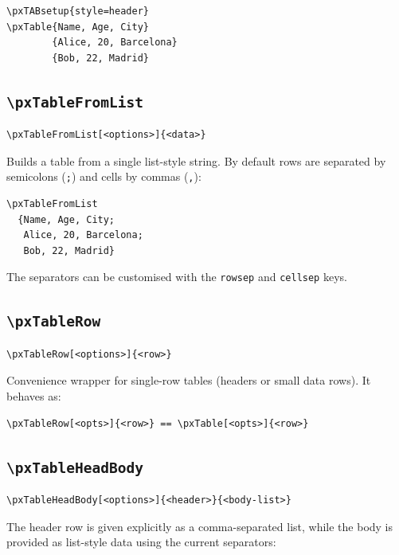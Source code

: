 \documentclass[11pt,a4paper]{article}
\begin{document}
\begin{verbatim}
\pxTABsetup{style=header}
\pxTable{Name, Age, City}
        {Alice, 20, Barcelona}
        {Bob, 22, Madrid}
\end{verbatim}

\subsection{\texttt{\textbackslash pxTableFromList}}

\begin{verbatim}
\pxTableFromList[<options>]{<data>}
\end{verbatim}

Builds a table from a single list-style string.  By default rows are
separated by semicolons (\verb|;|) and cells by commas (\verb|,|):

\begin{verbatim}
\pxTableFromList
  {Name, Age, City;
   Alice, 20, Barcelona;
   Bob, 22, Madrid}
\end{verbatim}

The separators can be customised with the \texttt{rowsep} and
\texttt{cellsep} keys.

\subsection{\texttt{\textbackslash pxTableRow}}

\begin{verbatim}
\pxTableRow[<options>]{<row>}
\end{verbatim}

Convenience wrapper for single-row tables (headers or small data
rows).  It behaves as:

\begin{verbatim}
\pxTableRow[<opts>]{<row>} == \pxTable[<opts>]{<row>}
\end{verbatim}

\subsection{\texttt{\textbackslash pxTableHeadBody}}

\begin{verbatim}
\pxTableHeadBody[<options>]{<header>}{<body-list>}
\end{verbatim}

The header row is given explicitly as a comma-separated list, while
the body is provided as list-style data using the current separators:
\end{document}
